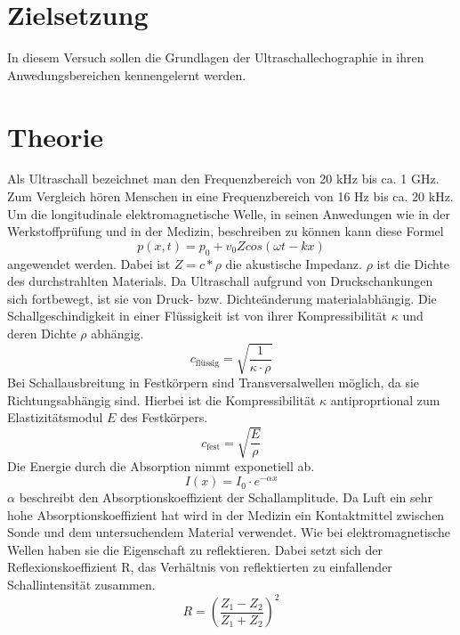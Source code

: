 \section{Zielsetzung}
In diesem Versuch sollen die Grundlagen der Ultraschallechographie
in ihren Anwedungsbereichen kennengelernt werden.
\section{Theorie}
Als Ultraschall bezeichnet man den Frequenzbereich von 20 kHz bis ca. 1 GHz.
Zum Vergleich hören Menschen in eine Frequenzbereich von 16 Hz bis ca. 20 kHz.
Um die longitudinale elektromagnetische Welle, in seinen Anwedungen wie in der Werkstoffprüfung
und in der Medizin, beschreiben zu können kann diese Formel
\begin{equation}
  p(x,t)= p_0 + v_0 Z cos(\omega t - k x)
  \label{eq:1}
\end{equation}
angewendet werden.
Dabei ist $Z = c* \rho$ die akustische Impedanz. $\rho$ ist die Dichte des durchstrahlten Materials.
Da Ultraschall aufgrund von Druckschankungen sich fortbewegt, ist sie von Druck- bzw. Dichteänderung materialabhängig.
Die Schallgeschindigkeit in einer Flüssigkeit ist von ihrer Kompressibilität $\kappa$ und deren Dichte $\rho$
abhängig.
\begin{equation}
  c_{\text{flüssig}} = \sqrt{\frac{1}{\kappa \cdot \rho}}
  \label{eq:2}
\end{equation}
Bei Schallausbreitung in Festkörpern sind Transversalwellen möglich, da sie Richtungsabhängig sind.
Hierbei ist die Kompressibilität $\kappa$ antiproprtional zum Elastizitätsmodul $E$ des Festkörpers.
\begin{equation}
  c_{\text{fest}} = \sqrt{\frac{E}{\rho}}
  \label{eq:3}
\end{equation}
Die Energie durch die Absorption nimmt exponetiell ab.
\begin{equation}
  I(x) =I_0 \cdot e^{-\alpha x}
  \label{eq:4}
\end{equation}
$\alpha$ beschreibt den Absorptionskoeffizient der Schallamplitude.
Da Luft ein sehr hohe Absorptionskoeffizient hat wird in der Medizin ein Kontaktmittel
zwischen Sonde und dem untersuchendem Material verwendet.
Wie bei elektromagnetische Wellen haben sie die Eigenschaft zu reflektieren.
Dabei setzt sich der Reflexionskoeffizient R, das Verhältnis von reflektierten zu einfallender Schallintensität zusammen.
\begin{equation}
  R = (\frac{Z_1 - Z_2} {Z_1 + Z_2})^2
  \label{eq:5}
\end{equation}
